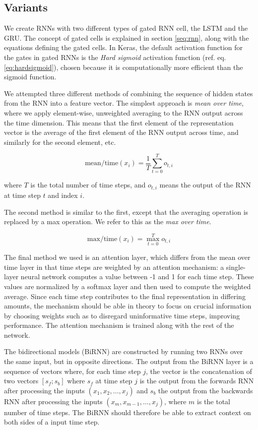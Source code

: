 \subsection{Variants}

We create \acp{RNN} with two different types of gated \ac{RNN} cell, the
\ac{LSTM} and the \ac{GRU}. The concept of gated cells is explained in
section \ref{seq:rnn}, along with the equations defining the gated cells. In
Keras, the default activation function for the gates in gated RNNs is the
\emph{Hard sigmoid} activation function (ref. eq. \ref{eq:hardsigmoid}),
chosen because it is computationally more efficient than the sigmoid
function.

We attempted three different methods of combining the sequence of hidden
states from the \ac{RNN} into a feature vector. The simplest approach is
\emph{mean over time}, where we apply element-wise, unweighted averaging to
the RNN output across the time dimension. This means that the first element
of the representation vector is the average of the first element of the RNN
output across time, and similarly for the second element, etc.

\[
  \mathrm{mean/time}(x_i) = \frac{1}{T}\sum_{t=0}^T o_{t,i}
\]

where $T$ is the total number of time steps, and $o_{t,i}$ means the output of
the RNN at time step $t$ and index $i$.

The second method is similar to the first, except that the averaging
operation is replaced by a max operation. We refer to this as the \emph{max
over time}.

\[
  \mathrm{max/time}(x_i) = \max_{t=0}^T o_{t,i}
\]

The final method we used is an attention layer, which differs from the mean
over time layer in that time steps are weighted by an attention mechanism: a
single-layer neural network computes a value between -1 and 1 for each time
step. These values are normalized by a softmax layer and then used to compute
the weighted average. Since each time step contributes to the final
representation in differing amounts, the mechanism should be able in theory
to focus on crucial information by choosing weights such as to disregard
uninformative time steps, improving performance. The attention mechanism is
trained along with the rest of the network.

The bidirectional models (BiRNN) are constructed by running two \acp{RNN}
over the same input, but in opposite directions. The output from the BiRNN
layer is a sequence of vectors where, for each time step $j$, the vector is
the concatenation of two vectors $[s_f;s_b]$ where $s_f$ at time step $j$ is
the output from the forwards \ac{RNN} after processing the inputs $(x_1, x_2,
\ldots, x_j)$ and $s_b$ the output from the backwards \ac{RNN} after
processing the inputs $(x_m, x_{m-1}, \ldots, x_j)$, where $m$ is the total
number of time steps. The BiRNN should therefore be able to extract context
on both sides of a input time step.

